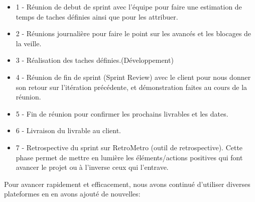 \begin{itemize}
	\item 1 - Réunion de debut de sprint avec l'équipe pour faire une estimation de temps de taches définies ainsi que pour les attribuer.\newline
	\item 2 - Réunions journalière pour faire le point sur les avancés et les blocages de la veille.\newline
	\item 3 - Réalisation des taches définies.(Développement)\newline
	\item 4 - Réunion de fin de sprint (Sprint Review) avec le client pour nous donner son retour sur l'itération précédente, et démonstration faites au cours de la réunion.\newline
	\item 5 - Fin de réunion pour confirmer les prochains livrables et les dates.\newline
	\item 6 - Livraison du livrable au client.\newline
	\item 7 - Retrospective du sprint sur RetroMetro (outil de retrospective). Cette phase permet de mettre en lumière les éléments/actions positives qui font avancer le projet ou à l'inverse ceux qui l'entrave. 
\end{itemize}

Pour avancer rapidement et efficacement, nous avons
continué d’utiliser diverses plateformes en en avons ajouté de nouvelles:\newline

